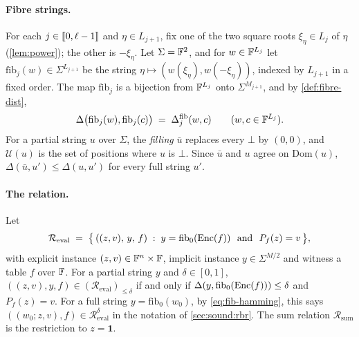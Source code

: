 \paragraph{Fibre strings.}
For each $j \in \llbracket 0, \ell-1 \rrbracket$ and $\eta \in L_{j+1}$, fix one of the two square roots $\xi_\eta \in L_j$ of $\eta$ (\cref{lem:power}); the other is $-\xi_\eta$.
Let $\Sigma = \mathbb{F}^2$, and for $w \in \mathbb{F}^{L_j}$ let $\mathrm{fib}_j(w) \in \Sigma^{L_{j+1}}$ be the string $\eta \mapsto (w(\xi_\eta), w(-\xi_\eta))$, indexed by $L_{j+1}$ in a fixed order.
The map $\mathrm{fib}_j$ is a bijection from $\mathbb{F}^{L_j}$ onto $\Sigma^{M_{j+1}}$, and by \cref{def:fibre-dist},
\begin{equation}\label{eq:fib-hamming}
  \Delta\bigl(\mathrm{fib}_j(w), \mathrm{fib}_j(c)\bigr) \;=\; \Delta^{\mathrm{fib}}_j(w, c) \qquad (w, c \in \mathbb{F}^{L_j}).
\end{equation}
For a partial string $u$ over $\Sigma$, the \emph{filling} $\bar u$ replaces every $\bot$ by $(0,0)$, and $\mathcal{U}(u)$ is the set of positions where $u$ is $\bot$.
Since $\bar u$ and $u$ agree on $\mathrm{Dom}(u)$, $\Delta(\bar u, u') \le \Delta(u, u')$ for every full string $u'$.

\paragraph{The relation.}
Let
\[
  \mathcal{R}_{\mathrm{eval}} \;=\; \bigl\{\, ((z,v),\, y,\, f) \;:\; y = \mathrm{fib}_0(\mathrm{Enc}(f)) \ \text{ and } \ P_f(z) = v \,\bigr\},
\]
with explicit instance $(z, v) \in \mathbb{F}^n \times \mathbb{F}$, implicit instance $y \in \Sigma^{M/2}$ and witness a table $f$ over $\mathbb{F}$.
For a partial string $y$ and $\delta \in [0,1]$, $((z,v), y, f) \in (\mathcal{R}_{\mathrm{eval}})_{\le\delta}$ if and only if $\Delta(y, \mathrm{fib}_0(\mathrm{Enc}(f))) \le \delta$ and $P_f(z) = v$.
For a full string $y = \mathrm{fib}_0(w_0)$, by \eqref{eq:fib-hamming}, this says $((w_0;z,v),f) \in \mathcal{R}^{\delta}_{\mathrm{eval}}$ in the notation of \cref{sec:sound:rbr}.
The sum relation $\mathcal{R}_{\mathrm{sum}}$ is the restriction to $z = \mathbf 1$.

